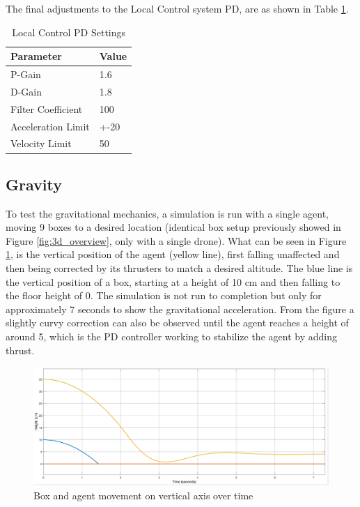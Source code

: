 The final adjustments to the Local Control system PD, are as shown in Table \ref{tab:pd_settings}.

\begin{table}[H]
\centering
\label{tab:pd_settings}
\begin{tabular}{ll}
\hline
\textbf{Parameter} & \textbf{Value} \\ \hline
P-Gain             & 1.6            \\
D-Gain             & 1.8            \\
Filter Coefficient & 100            \\
Acceleration Limit & +-20           \\
Velocity Limit     & 50             \\ \hline
\end{tabular}
\caption{Local Control PD Settings}
\end{table}

\subsection{Gravity}
\label{sim:sec:gravity}
To test the gravitational mechanics, a simulation is run with a single agent, moving 9 boxes to a desired location (identical box setup previously showed in Figure \ref{fig:3d_overview}, only with a single drone). What can be seen in Figure \ref{fig:vertical_SA}, is the vertical position of the agent (yellow line), first falling unaffected and then being corrected by its thrusters to match a desired altitude. The blue line is the vertical position of a box, starting at a height of 10 cm and then falling to the floor height of 0. The simulation is not run to completion but only for approximately 7 seconds to show the gravitational acceleration. From the figure a slightly curvy correction can also be observed until the agent reaches a height of around 5, which is the PD controller working to stabilize the agent by adding thrust.


\begin{figure}[H]
  \centering
  \includegraphics[width=0.8\columnwidth]{figures/SA_y_axis_objects}
  \caption{\label{fig:vertical_SA}Box and agent movement on vertical axis over time}
\end{figure}

